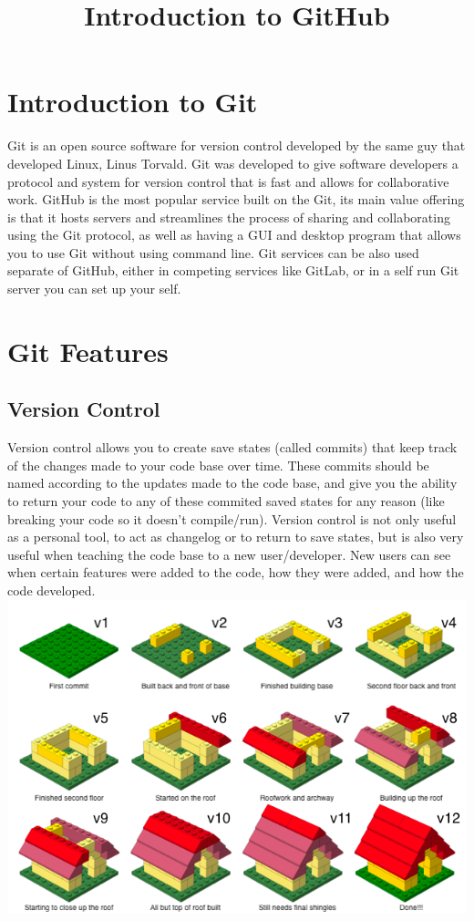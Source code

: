 \documentclass{article}
\author{}
\date{}
\title{\vspace{-4cm}Introduction to GitHub}
\begin{document}
\maketitle
\section{Introduction to Git}
Git is an open source software for version control developed by the same guy that developed Linux, Linus Torvald. Git was developed to give software developers a protocol and system for version control that is fast and allows for collaborative work. GitHub is the most popular service built on the Git, its main value offering is that it hosts servers and streamlines the process of sharing and collaborating using the Git protocol, as well as having a GUI and desktop program that allows you to use Git without using command line. Git services can be also used separate of GitHub, either in competing services like GitLab, or in a self run Git server you can set up your self.
\section{Git Features}
\subsection{Version Control}
Version control allows you to create save states (called commits) that keep track of the changes made to your code base over time. These commits should be named according to the updates made to the code base, and give you the ability to return your code to any of these commited saved states for any reason (like breaking your code so it doesn't compile/run). Version control is not only useful as a personal tool, to act as changelog or to return to save states, but is also very useful when teaching the code base to a new user/developer. New users can see when certain features were added to the code, how they were added, and how the code developed.
\\
\includegraphics[width=\textwidth]{lego-steps-commit-messages.png}
\end{document}
